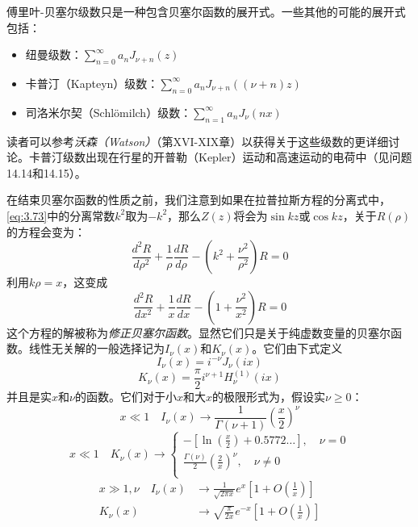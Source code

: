 \documentclass[12pt]{book}
\numberwithin{equation}{chapter}
\numberwithin{figure}{chapter}
\numberwithin{footnote}{page}
\begin{document}
傅里叶-贝塞尔级数只是一种包含贝塞尔函数的展开式。一些其他的可能的展开式包括：
\begin{itemize}
    \item 纽曼级数：$\sum_{n=0}^\infty a_nJ_{\nu+n}(z)$
    \item 卡普汀（Kapteyn）级数：$\sum_{n=0}^\infty a_nJ_{\nu+n}((\nu+n)z)$
    \item 司洛米尔契（Schlömilch）级数：$\sum_{n=1}^\infty a_nJ_\nu(nx)$
\end{itemize}
读者可以参考\textit{沃森（Watson）}（第XVI-XIX章）以获得关于这些级数的更详细讨论。卡普汀级数出现在行星的开普勒（Kepler）运动和高速运动的电荷中（见问题14.14和14.15）。

在结束贝塞尔函数的性质之前，我们注意到如果在拉普拉斯方程的分离式中，\autoref{eq:3.73}中的分离常数$k^2$取为$-k^2$，那么$Z(z)$将会为$\sin kz$或$\cos kz$，关于$R(\rho)$的方程会变为：
\begin{equation}\label{eq:3.98}
    \frac{d^2 R}{d\rho^2}+\frac{1}{\rho}\frac{dR}{d\rho}-(k^2+\frac{\nu^2}{\rho^2})R=0
\end{equation}
利用$k\rho=x$，这变成
\begin{equation}\label{eq:3.99}
    \frac{d^2 R}{dx^2}+\frac{1}{x}\frac{dR}{dx}-(1+\frac{\nu^2}{x^2})R=0
\end{equation}
这个方程的解被称为\textit{修正贝塞尔函数}。显然它们只是关于纯虚数变量的贝塞尔函数。线性无关解的一般选择记为$I_\nu(x)$和$K_\nu(x)$。它们由下式定义
\begin{equation}\label{eq:3.100}
    I_\nu(x)=i^{-\nu}J_\nu(ix)
\end{equation}
\begin{equation}\label{eq:3.101}
    K_\nu(x)=\frac{\pi}{2}i^{\nu+1}H_\nu^{(1)}(ix)
\end{equation}
并且是实$x$和$\nu$的函数。它们对于小$x$和大$x$的极限形式为，假设实$\nu\geq0$：
\begin{equation}\label{eq:3.102}
    x\ll 1 \quad I_\nu(x)\to\frac{1}{\Gamma(\nu+1)}(\frac{x}{2})^\nu
\end{equation}
\begin{equation}\label{eq:3.103}
    x\ll 1 \quad K_\nu(x)\to
    \begin{cases}
        -[\ln(\frac{x}{2})+0.5772\dots], \quad \nu=0\\
        \frac{\Gamma(\nu)}{2}(\frac{2}{x})^\nu, \quad \nu\neq0\\
    \end{cases}
\end{equation}
\begin{equation}\label{eq:3.104}
    \begin{aligned}
        x\gg 1,\nu \quad I_\nu(x)&\to\frac{1}{\sqrt{2\pi x}}e^x[1+O(\frac{1}{x})]\\
        K_\nu(x)&\to\sqrt{\frac{\pi}{2x}}e^{-x}[1+O(\frac{1}{x})]\\
    \end{aligned}
\end{equation}
\end{document}
